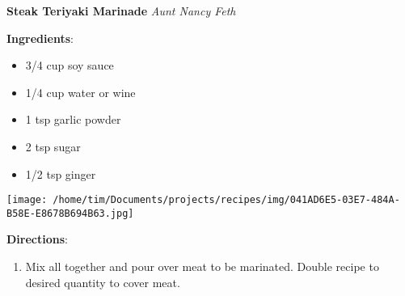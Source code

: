 \documentclass[11pt, twoside, openany]{book}
\begin{document}
\noindent\begin{minipage}[t]{\linewidth}%
{\Large\textbf{Steak Teriyaki Marinade}} \label{steak-teriyaki-marinade}\hfill\textit{Aunt Nancy Feth}\\
\noindent\begin{minipage}[t]{0.78\linewidth}%
\textbf{Ingredients}:\vspace{-3mm}
\begin{multicols}{2}
\begin{itemize}\setlength\itemsep{-1mm}
\item 3/4 cup soy sauce
\item 1/4 cup water or wine
\item 1 tsp garlic powder
\item 2 tsp sugar
\item 1/2 tsp ginger
\end{itemize}
\end{multicols}
\end{minipage}
\noindent\begin{minipage}[t]{0.18\linewidth}
\centering \strut\vspace*{-\baselineskip}\newline
\texttt{[image: /home/tim/Documents/projects/recipes/img/041AD6E5-03E7-484A-B58E-E8678B694B63.jpg]}\\
\end{minipage}\vspace{3mm}
\textbf{Directions}:
\vspace{-3mm}\begin{enumerate}\setlength\itemsep{-1mm}
\item Mix all together and pour over meat to be marinated. Double recipe to desired quantity to cover meat.
\end{enumerate}
\end{minipage}\vspace{8mm}
\end{document}
